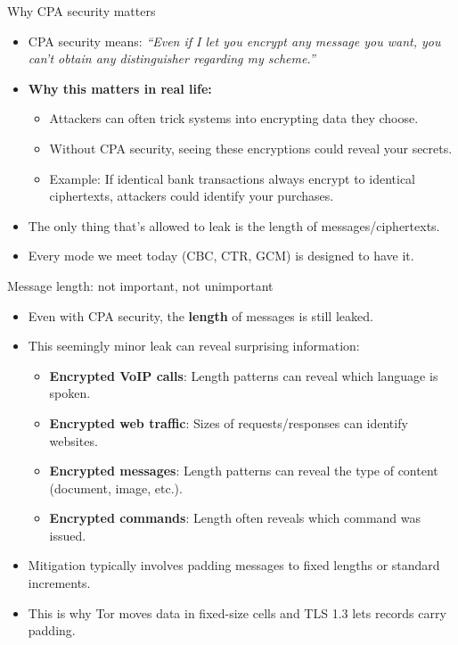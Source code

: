 \ifdefined\PRESENTATION\else\PassOptionsToClass{handout}{beamer}\fi\documentclass[aspectratio=169, lualatex]{beamer}
\begin{document}
\begin{frame}{Why CPA security matters}
	\begin{itemize}[<+->]
		\item CPA security means: \textit{``Even if I let you encrypt any message you want, you can't obtain any distinguisher regarding my scheme.''}
		\item \textbf{Why this matters in real life:}
		      \begin{itemize}
			      \item Attackers can often trick systems into encrypting data they choose.
			      \item Without CPA security, seeing these encryptions could reveal your secrets.
			      \item Example: If identical bank transactions always encrypt to identical ciphertexts, attackers could identify your purchases.
		      \end{itemize}
		\item The only thing that's allowed to leak is the length of messages/ciphertexts.
		\item Every mode we meet today (CBC, CTR, GCM) is designed to have it.
	\end{itemize}
\end{frame}

\begin{frame}{Message length: not important, not unimportant}
	\begin{itemize}[<+->]
		\item Even with CPA security, the \textbf{length} of messages is still leaked.
		\item This seemingly minor leak can reveal surprising information:
		      \begin{itemize}
			      \item \textbf{Encrypted VoIP calls}: Length patterns can reveal which language is spoken.
			      \item \textbf{Encrypted web traffic}: Sizes of requests/responses can identify websites.
			      \item \textbf{Encrypted messages}: Length patterns can reveal the type of content (document, image, etc.).
			      \item \textbf{Encrypted commands}: Length often reveals which command was issued.
		      \end{itemize}
		\item Mitigation typically involves padding messages to fixed lengths or standard increments.
		\item This is why Tor moves data in fixed-size cells and TLS 1.3 lets records carry padding.
	\end{itemize}
\end{frame}
\end{document}
